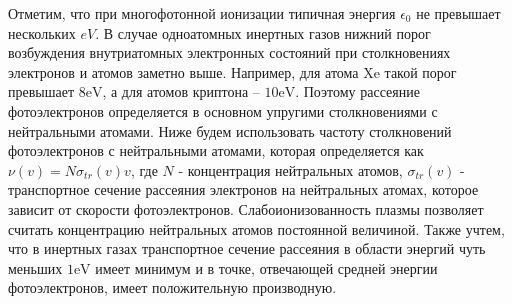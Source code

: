 \documentclass[12pt,a4paper]{article}
\numberwithin{equation}{section}
\begin{document}
Отметим, что при многофотонной ионизации типичная энергия $\epsilon_0$ не превышает нескольких $eV$. В случае одноатомных инертных газов нижний порог возбуждения внутриатомных электронных состояний при столкновениях электронов и атомов заметно выше. Например, для атома $\textrm{Xe}$ такой порог превышает $8 \text{eV}$, а для атомов криптона  -- $10 \text{eV}$. Поэтому рассеяние фотоэлектронов определяется в основном упругими столкновениями с нейтральными атомами. Ниже будем использовать частоту столкновений фотоэлектронов с нейтральными атомами, которая определяется как $\nu\left(v\right)= N\sigma_{tr}\left(v\right)v$, где $N$ - концентрация нейтральных атомов, $\sigma_{tr}\left(v\right)$ - транспортное сечение рассеяния электронов на нейтральных атомах, которое зависит от скорости фотоэлектронов. Слабоионизованность плазмы позволяет считать концентрацию нейтральных атомов постоянной величиной. Также  учтем, что в инертных газах транспортное сечение рассеяния в области энергий чуть меньших $1\text{eV}$ имеет минимум \cite{refTOWNSEND, refRAMSAUER,refBRODE} и в точке, отвечающей средней энергии фотоэлектронов, имеет положительную производную.   

\end{document}

